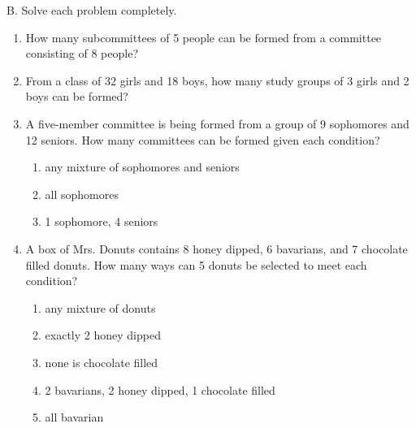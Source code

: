 B. Solve each problem completely. 
\begin{enumerate}[label = \arabic*. ]
\item How many subcommittees of 5 people can be formed from a committee consisting of 8 people?

\item From  a class of 32 girls and 18 boys, how many study groups of 3 girls and 2 boys can
be formed?

\item A five-member committee is being formed from a group of 9 sophomores and 12 seniors. How many committees can be formed given each condition?
\begin{enumerate}[label = \alph*. ]

\item any mixture of sophomores and seniors
\item all sophomores
\item 1 sophomore, 4 seniors

\end{enumerate}  
\item A box of Mrs. Donuts contains 8 honey dipped, 6 bavarians, and 7 chocolate filled donuts. How many ways can 5 donuts be selected to meet each condition? 
\begin{enumerate}[label = \alph*. ]
\item any mixture of donuts 
\item exactly 2 honey dipped 
\item none is chocolate filled
\item 2 bavarians, 2 honey dipped, 1 chocolate filled
\item all bavarian
\end{enumerate}  

\end{enumerate}